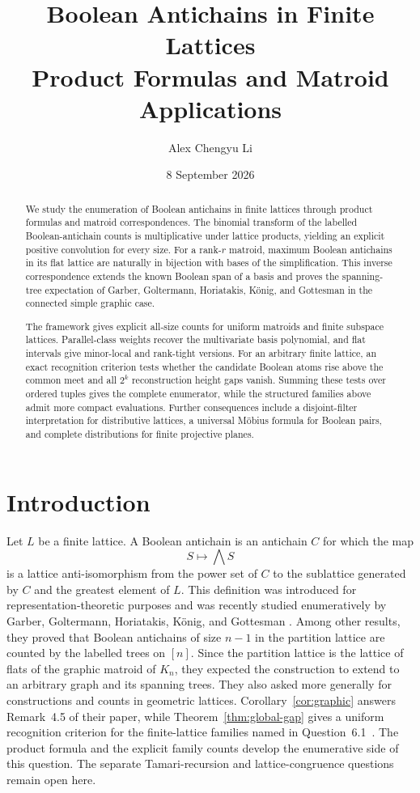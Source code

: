 \documentclass[11pt]{article}
\title{Boolean Antichains in Finite Lattices\\
Product Formulas and Matroid Applications}
\author{Alex Chengyu Li}
\date{8 September 2026}
\theoremstyle{definition}
\theoremstyle{remark}
\begin{document}
\maketitle

\begin{abstract}
We study the enumeration of Boolean antichains in finite lattices through
product formulas and matroid correspondences.  The binomial transform of the
labelled Boolean-antichain counts is multiplicative under lattice products,
yielding an explicit positive convolution for every size.  For a rank-$r$
matroid, maximum Boolean antichains in its flat lattice are naturally in
bijection with bases of the simplification.  This inverse correspondence
extends the known Boolean span of a basis and proves the spanning-tree
expectation of Garber, Goltermann, Horiatakis, K\"onig, and Gottesman in the
connected simple graphic case.

The framework gives explicit all-size counts for uniform matroids and finite
subspace lattices.  Parallel-class weights recover the multivariate basis
polynomial, and flat intervals give minor-local and rank-tight versions.
For an arbitrary finite lattice, an exact recognition criterion tests whether
the candidate Boolean atoms rise above the common meet and all $2^k$
reconstruction height gaps vanish.  Summing these tests over ordered tuples
gives the complete enumerator, while the structured families above admit
more compact evaluations.  Further consequences include a disjoint-filter
interpretation for distributive lattices, a universal M\"obius formula for
Boolean pairs, and complete distributions for finite projective planes.
\end{abstract}

\section{Introduction}

Let $L$ be a finite lattice.  A Boolean antichain is an antichain $C$ for
which the map
\[
  S\longmapsto \bigwedge S
\]
is a lattice anti-isomorphism from the power set of $C$ to the sublattice
generated by $C$ and the greatest element of $L$.  This definition was
introduced for representation-theoretic purposes and was recently studied
enumeratively by Garber, Goltermann, Horiatakis, K\"onig, and Gottesman
\cite{GarberEtAl2026}.  Among other results, they proved that Boolean
antichains of size $n-1$ in the partition lattice are counted by the labelled
trees on $[n]$.  Since the partition lattice is the lattice of flats of the
graphic matroid of $K_n$, they expected the construction to extend to an
arbitrary graph and its spanning trees.  They also asked more generally for
constructions and counts in geometric lattices.
Corollary~\ref{cor:graphic} answers Remark~4.5 of their paper, while
Theorem~\ref{thm:global-gap} gives a uniform recognition criterion for the
finite-lattice families named in Question~6.1~\cite{GarberEtAl2026}.  The
product formula and the explicit family counts develop the enumerative side
of this question.  The separate Tamari-recursion and lattice-congruence
questions remain open here.
\end{document}
